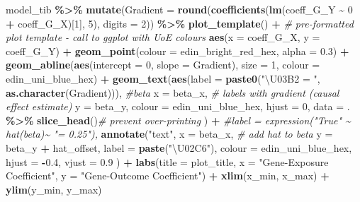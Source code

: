 \documentclass[
]{article}
\newenvironment{Shaded}{\begin{snugshade}}{\end{snugshade}}
\newcommand{\AttributeTok}[1]{\textcolor[rgb]{0.13,0.29,0.53}{#1}}
\newcommand{\CommentTok}[1]{\textcolor[rgb]{0.56,0.35,0.01}{\textit{#1}}}
\newcommand{\DecValTok}[1]{\textcolor[rgb]{0.00,0.00,0.81}{#1}}
\newcommand{\FloatTok}[1]{\textcolor[rgb]{0.00,0.00,0.81}{#1}}
\newcommand{\FunctionTok}[1]{\textcolor[rgb]{0.13,0.29,0.53}{\textbf{#1}}}
\newcommand{\NormalTok}[1]{#1}
\newcommand{\SpecialCharTok}[1]{\textcolor[rgb]{0.81,0.36,0.00}{\textbf{#1}}}
\newcommand{\StringTok}[1]{\textcolor[rgb]{0.31,0.60,0.02}{#1}}
\begin{document}
\begin{Shaded}
\begin{Highlighting}[]
\NormalTok{  model\_tib }\SpecialCharTok{\%\textgreater{}\%} 
    \FunctionTok{mutate}\NormalTok{(}\AttributeTok{Gradient =} \FunctionTok{round}\NormalTok{(}\FunctionTok{coefficients}\NormalTok{(}\FunctionTok{lm}\NormalTok{(coeff\_G\_Y }\SpecialCharTok{\textasciitilde{}} \DecValTok{0} \SpecialCharTok{+}\NormalTok{ coeff\_G\_X)[}\DecValTok{1}\NormalTok{], }\DecValTok{5}\NormalTok{), }
                            \AttributeTok{digits =} \DecValTok{2}\NormalTok{)) }\SpecialCharTok{\%\textgreater{}\%}
    \FunctionTok{plot\_template}\NormalTok{() }\SpecialCharTok{+} \CommentTok{\# pre{-}formatted plot template {-} call to ggplot with UoE colours}
    \FunctionTok{aes}\NormalTok{(}\AttributeTok{x =}\NormalTok{ coeff\_G\_X, }\AttributeTok{y =}\NormalTok{ coeff\_G\_Y) }\SpecialCharTok{+}
    \FunctionTok{geom\_point}\NormalTok{(}\AttributeTok{colour =}\NormalTok{ edin\_bright\_red\_hex, }\AttributeTok{alpha =} \FloatTok{0.3}\NormalTok{) }\SpecialCharTok{+}
    \FunctionTok{geom\_abline}\NormalTok{(}\FunctionTok{aes}\NormalTok{(}\AttributeTok{intercept =} \DecValTok{0}\NormalTok{, }
                    \AttributeTok{slope =}\NormalTok{ Gradient),}
                \AttributeTok{size =} \DecValTok{1}\NormalTok{,}
                \AttributeTok{colour =}\NormalTok{ edin\_uni\_blue\_hex) }\SpecialCharTok{+}
    \FunctionTok{geom\_text}\NormalTok{(}\FunctionTok{aes}\NormalTok{(}\AttributeTok{label =} \FunctionTok{paste0}\NormalTok{(}\StringTok{"\textbackslash{}U03B2 = "}\NormalTok{, }\FunctionTok{as.character}\NormalTok{(Gradient))), }\CommentTok{\#beta}
              \AttributeTok{x =}\NormalTok{ beta\_x, }\CommentTok{\# labels with gradient (causal effect estimate)}
              \AttributeTok{y =}\NormalTok{ beta\_y,}
              \AttributeTok{colour =}\NormalTok{ edin\_uni\_blue\_hex, }
              \AttributeTok{hjust =} \DecValTok{0}\NormalTok{, }
              \AttributeTok{data =}\NormalTok{ . }\SpecialCharTok{\%\textgreater{}\%} \FunctionTok{slice\_head}\NormalTok{()}\CommentTok{\# prevent over{-}printing}
\NormalTok{    ) }\SpecialCharTok{+}
    \CommentTok{\#label = expression("True" \textasciitilde{} hat(beta)\textasciitilde{} "= 0.25"),}
    \FunctionTok{annotate}\NormalTok{(}\StringTok{"text"}\NormalTok{,}
             \AttributeTok{x =}\NormalTok{ beta\_x,      }\CommentTok{\# add hat to beta}
             \AttributeTok{y =}\NormalTok{ beta\_y }\SpecialCharTok{+}\NormalTok{ hat\_offset,}
             \AttributeTok{label =} \FunctionTok{paste}\NormalTok{(}\StringTok{"\textbackslash{}U02C6"}\NormalTok{),}
             \AttributeTok{colour =}\NormalTok{ edin\_uni\_blue\_hex, }
             \AttributeTok{hjust =} \SpecialCharTok{{-}}\FloatTok{0.4}\NormalTok{,}
             \AttributeTok{vjust =} \FloatTok{0.9}
\NormalTok{    ) }\SpecialCharTok{+}
    \FunctionTok{labs}\NormalTok{(}\AttributeTok{title =}\NormalTok{ plot\_title,}
         \AttributeTok{x =} \StringTok{"Gene{-}Exposure Coefficient"}\NormalTok{,}
         \AttributeTok{y =} \StringTok{"Gene{-}Outcome Coefficient"}\NormalTok{) }\SpecialCharTok{+}
    \FunctionTok{xlim}\NormalTok{(x\_min, x\_max) }\SpecialCharTok{+}
    \FunctionTok{ylim}\NormalTok{(y\_min, y\_max)}
  

\end{Highlighting}
\end{Shaded}
\end{document}
